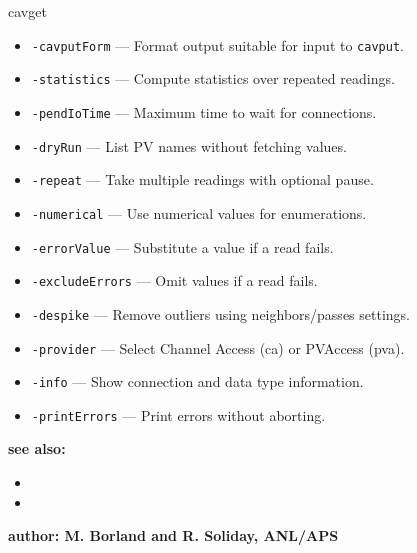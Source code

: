 \begin{sddsprog}{cavget}
\begin{itemize}
    \item {\tt -cavputForm} --- Format output suitable for input to \verb+cavput+.
    \item {\tt -statistics} --- Compute statistics over repeated readings.
    \item {\tt -pendIoTime} --- Maximum time to wait for connections.
    \item {\tt -dryRun} --- List PV names without fetching values.
    \item {\tt -repeat} --- Take multiple readings with optional pause.
    \item {\tt -numerical} --- Use numerical values for enumerations.
    \item {\tt -errorValue} --- Substitute a value if a read fails.
    \item {\tt -excludeErrors} --- Omit values if a read fails.
    \item {\tt -despike} --- Remove outliers using neighbors/passes settings.
    \item {\tt -provider} --- Select Channel Access (ca) or PVAccess (pva).
    \item {\tt -info} --- Show connection and data type information.
    \item {\tt -printErrors} --- Print errors without aborting.
  \end{itemize}
\item {\bf see also:}
  \begin{itemize}
    \item {}
    \item {}
  \end{itemize}
\item {\bf author: M. Borland and R. Soliday, ANL/APS}
\end{sddsprog}
